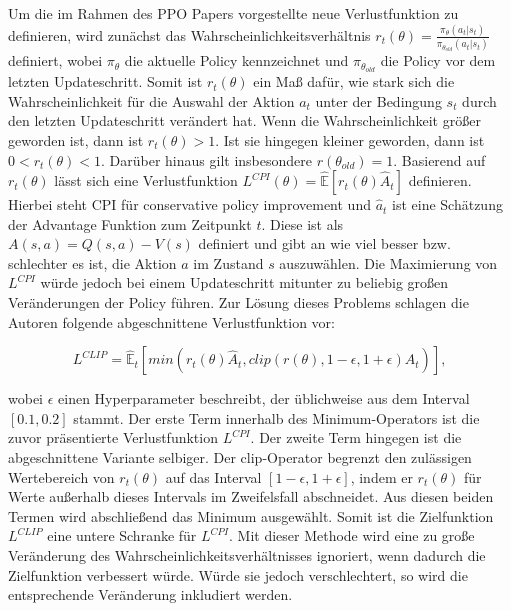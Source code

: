 Um die im Rahmen des PPO Papers vorgestellte neue Verlustfunktion zu definieren, wird zunächst das Wahrscheinlichkeitsverhältnis $r_t(\theta) = \frac{\pi_\theta(a_t|s_t)}{\pi_{\theta_{old}}(a_t|s_t)}$ definiert, wobei $\pi_\theta$ die aktuelle Policy kennzeichnet und $\pi_{\theta_{old}}$ die Policy vor dem letzten Updateschritt. Somit ist $r_t(\theta)$ ein Maß dafür, wie stark sich die Wahrscheinlichkeit für die Auswahl der Aktion $a_t$ unter der Bedingung $s_t$ durch den letzten Updateschritt verändert hat. Wenn die Wahrscheinlichkeit größer geworden ist, dann ist $r_t(\theta) > 1$. Ist sie hingegen kleiner geworden, dann ist $0 < r_t(\theta) < 1$. Darüber hinaus gilt insbesondere $r(\theta_{old}) = 1$. Basierend auf $r_t(\theta)$ lässt sich eine Verlustfunktion $L^{CPI}(\theta) = \hat{\mathbb{E}}[r_t(\theta) \hat{A}_t]$ definieren. Hierbei steht CPI für conservative policy improvement und $\hat{a}_t$ ist eine Schätzung der Advantage Funktion zum Zeitpunkt $t$. Diese ist als $A(s,a) = Q(s,a) - V(s)$ definiert und gibt an wie viel besser bzw. schlechter es ist, die Aktion $a$ im Zustand $s$ auszuwählen. Die Maximierung von $L^{CPI}$ würde jedoch bei einem Updateschritt mitunter zu beliebig großen Veränderungen der Policy führen. Zur Lösung dieses Problems schlagen die Autoren folgende abgeschnittene Verlustfunktion vor:

\begin{equation}
  \label{L_CLIP}
	L^{CLIP} = \hat{\mathbb{E}}_t[min(r_t(\theta) \hat{A}_t, clip(r(\theta), 1-\epsilon, 1+\epsilon) \hat{A}_t)],
\end{equation}

wobei $\epsilon$ einen Hyperparameter beschreibt, der üblichweise aus dem Interval $[0.1, 0.2]$ stammt. Der erste Term innerhalb des Minimum-Operators ist die zuvor präsentierte Verlustfunktion $L^{CPI}$. Der zweite Term hingegen ist die abgeschnittene Variante selbiger. Der clip-Operator begrenzt den zulässigen Wertebereich von $r_t(\theta)$ auf das Interval $[1-\epsilon, 1+\epsilon]$, indem er $r_t(\theta)$ für Werte außerhalb dieses Intervals im Zweifelsfall abschneidet. Aus diesen beiden Termen wird abschließend das Minimum ausgewählt. Somit ist die Zielfunktion $L^{CLIP}$ eine untere Schranke für $L^{CPI}$. Mit dieser Methode wird eine zu große Veränderung des Wahrscheinlichkeitsverhältnisses ignoriert, wenn dadurch die Zielfunktion verbessert würde. Würde sie jedoch verschlechtert, so wird die entsprechende Veränderung inkludiert werden.

